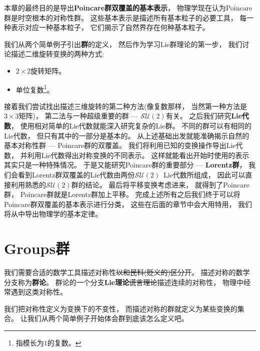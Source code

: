 本章的最终目的是导出{\bf{Poincare群双覆盖的基本表示}}， 物理学现在认为Poincare群是时空根本的对称性群。 这些基本表示是描述所有基本粒子的必要工具， 每一种表示对应一种基本粒子， 它们揭示了自然界存在何种基本粒子。

我们从两个简单例子引出{\bf{群}}的定义， 然后作为学习Lie群理论的第一步， 我们讨论描述二维旋转变换的两种方式:
\begin{itemize}
	\item $2 \times 2$旋转矩阵。
	\item 单位复数\footnote{指模长为$1$的复数。}。
\end{itemize}

接着我们尝试找出描述三维旋转的第二种方法(像复数那样， 当然第一种方法是$3\times3$矩阵)， 第二法与一种超级重要的群 --- {\bf{$\mathcal{SU}(2)$}}有关。 之后我们研究{\bf{Lie代数}}， 使用相对简单的Lie代数就能深入研究复杂的Lie群。 不同的群可以有相同的Lie代数， 但只有其中的一部分是基本的。
从上述基础出发就能准确揭示自然的基本对称性群 --- Poincare群的双覆盖。
我们将利用已知的变换操作导出Lie代数， 并利用Lie代数得出对称变换的不同表示。 这样就能看出开始时使用的表示其实只是一种特殊情况。 于是又能研究Poincare群的重要部分 --- {\bf{Lorentz群}}， 我们会看到Lorentz群双覆盖的Lie代数由两份$\mathcal{SU}(2)$\, Lie代数所组成， 因此可以直接利用熟悉的$\mathcal{SU}(2)$群的结论。 最后将平移变换考虑进来， 就得到了Poincare群， Poincare群就是Lorentz群加上平移。 完成上述所有之后我们终于可以将Poincare群双覆盖的基本表示进行分类， 这些在后面的章节中会大用特用， 我们将从中导出物理学的基本定律。

\section[群]{Groups\quad 群}
\label{sec3.1}
我们需要合适的数学工具描述对称性\sout{以和民科(贬义的)区分开}。 描述对称的数学分支称为{\bf{群论}}。 群论的一个分支{\bf{Lie理论}}\sout{谎言理论}描述连续的对称性， 物理中经常遇到这类对称性。

我们把对称性定义为变换下的不变性， 而描述对称的群就定义为某些变换的集合。 让我们从两个简单例子开始体会群到底该怎么定义吧。



